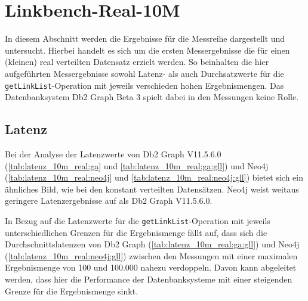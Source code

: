 \section{Linkbench-Real-10M}
\label{ergebnisse:10m_real}
In diesem Abschnitt werden die Ergebnisse für die Messreihe  dargestellt und untersucht. Hierbei handelt es sich um die ersten Messergebnisse die für einen (kleinen) real verteilten Datensatz erzielt werden. So beinhalten die hier aufgeführten Messergebnisse sowohl Latenz- als auch Durchsatzwerte für die \texttt{getLinkList}-Ope\-ra\-ti\-on mit jeweils verschieden hohen Ergebnismengen. Das Datenbanksystem Db2 Graph Beta 3 spielt dabei in den Messungen keine Rolle.

\subsection{Latenz}
Bei der Analyse der Latenzwerte von Db2 Graph V11.5.6.0 (\autoref{tab:latenz_10m_real:ga} und \ref{tab:latenz_10m_real:ga:gll}) und Neo4j (\autoref{tab:latenz_10m_real:neo4j} und \ref{tab:latenz_10m_real:neo4j:gll}) bietet sich ein ähnliches Bild, wie bei den konstant verteilten Datensätzen. Neo4j weist weitaus geringere Latenzergebnisse auf als Db2 Graph V11.5.6.0. 

In Bezug auf die Latenzwerte für die \texttt{getLinkList}-Ope\-ra\-ti\-on mit jeweils unterschiedlichen Grenzen für die Ergebnismenge fällt auf, dass sich die Durchschnittslatenzen von Db2 Graph (\autoref{tab:latenz_10m_real:ga:gll}) und Neo4j (\autoref{tab:latenz_10m_real:neo4j:gll}) zwischen den Messungen mit einer maximalen Ergebnismenge von 100 und 100.000 nahezu verdoppeln. Davon kann abgeleitet werden, dass hier die Performance der Datenbanksysteme mit einer steigenden Grenze für die Ergebnismenge sinkt.

\begin{table}[!ht]
\centering
{}
\caption{Latenz Linkbench-Real-10M Db2 Graph V11.5.6.0}
\label{tab:latenz_10m_real:ga}
\end{table}    

